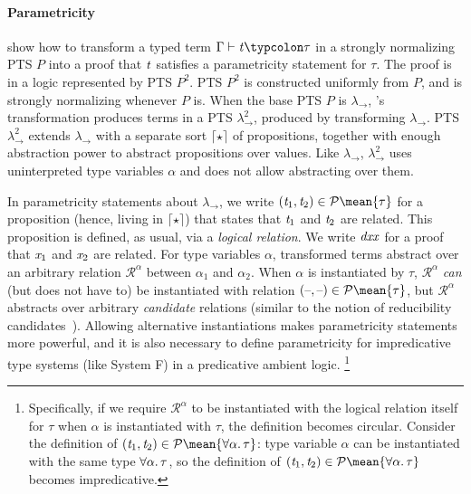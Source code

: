 \paragraph{Parametricity}
\citeauthor{Bernardy2011realizability} show how to transform a typed term \ensuremath{\Gamma\vdash\Varid{t}\typcolon\tau} in a strongly normalizing PTS $P$ into a proof that \ensuremath{\Varid{t}} satisfies a
parametricity statement for \ensuremath{\tau}. The proof is in a logic represented by PTS
$P^2$. PTS $P^2$ is constructed uniformly from $P$, and is strongly normalizing
whenever $P$ is.
When the base PTS $P$ is \ensuremath{\lambda_{\to}},
\citeauthor{Bernardy2011realizability}'s transformation produces terms
in a PTS \ensuremath{\lambda_{\to}^2}, produced by transforming \ensuremath{\lambda_{\to}}.
PTS \ensuremath{\lambda_{\to}^2} extends \ensuremath{\lambda_{\to}} with a separate sort \ensuremath{\lceil \star \rceil} of propositions, together with
enough abstraction power to abstract propositions over values.
Like \ensuremath{\lambda_{\to}}, \ensuremath{\lambda_{\to}^2} uses uninterpreted type variables \ensuremath{\alpha} and does not
allow abstracting over them.

In parametricity statements about \ensuremath{\lambda_{\to}}, we write \ensuremath{(\Varid{t}_{1},\Varid{t}_{2})\in \mathcal{P}\mean{\tau}} for a
proposition (hence, living in \ensuremath{\lceil \star \rceil}) that states that \ensuremath{\Varid{t}_{1}} and \ensuremath{\Varid{t}_{2}} are
related. This proposition is defined, as usual, via a \emph{logical relation}.
We write \ensuremath{\Varid{dxx}} for a proof that \ensuremath{\Varid{x}_{1}} and \ensuremath{\Varid{x}_{2}} are related. For type variables \ensuremath{\alpha},
transformed terms abstract over an arbitrary relation \ensuremath{\mathcal{R}^\alpha} between \ensuremath{\alpha_{1}} and
\ensuremath{\alpha_{2}}. When \ensuremath{\alpha} is instantiated by \ensuremath{\tau}, \ensuremath{\mathcal{R}^\alpha} \emph{can} (but does
not have to) be instantiated with relation \ensuremath{(\text{\textendash},\text{\textendash})\in \mathcal{P}\mean{\tau}}, but \ensuremath{\mathcal{R}^\alpha} abstracts
over arbitrary \emph{candidate} relations (similar to the notion of reducibility
candidates~\citep[Ch.~14.1.1]{girard1989proofs}). Allowing alternative
instantiations makes parametricity statements more powerful, and it is also
necessary to define parametricity for impredicative type systems (like System F)
in a predicative ambient logic.%
\footnote{Specifically, if we require \ensuremath{\mathcal{R}^\alpha} to be instantiated with the
logical relation itself for \ensuremath{\tau} when \ensuremath{\alpha} is instantiated with \ensuremath{\tau}, the
definition becomes circular. Consider the definition of \ensuremath{(\Varid{t}_{1},\Varid{t}_{2})\in \mathcal{P}\mean{\forall \alpha\hsforall \hsdot{\circ }{\mathpunct{.}}\tau}}: type variable \ensuremath{\alpha} can be instantiated with the same type
\ensuremath{\forall \alpha\hsforall \hsdot{\circ }{\mathpunct{.}}\tau}, so the definition of \ensuremath{(\Varid{t}_{1},\Varid{t}_{2})\in \mathcal{P}\mean{\forall \alpha\hsforall \hsdot{\circ }{\mathpunct{.}}\tau}}
becomes impredicative.}


